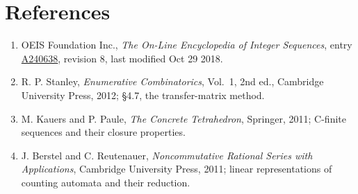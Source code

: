 \documentclass[11pt]{article}
\theoremstyle{definition}
\begin{document}
\section{References}

\begin{enumerate}

\item OEIS Foundation Inc., \emph{The On-Line Encyclopedia of Integer Sequences}, entry \href{https://oeis.org/A240638}{A240638}, revision 8, last modified Oct 29 2018.

\item R. P. Stanley, \emph{Enumerative Combinatorics}, Vol.~1, 2nd ed., Cambridge University Press, 2012; \S4.7, the transfer-matrix method.

\item M. Kauers and P. Paule, \emph{The Concrete Tetrahedron}, Springer, 2011; C-finite sequences and their closure properties.

\item J. Berstel and C. Reutenauer, \emph{Noncommutative Rational Series with Applications}, Cambridge University Press, 2011; linear representations of counting automata and their reduction.

\end{enumerate}
\end{document}
